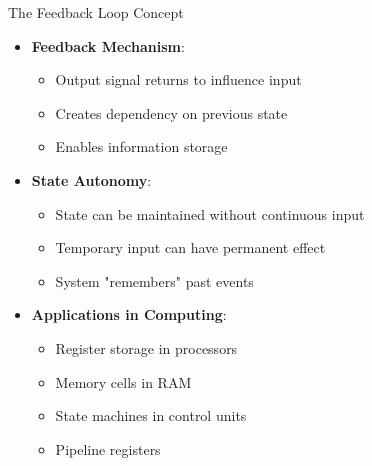 \documentclass[aspectratio=169,11pt]{beamer}
\newcommand{\concept}[1]{\textbf{\color{accentcolor}#1}}
\begin{document}
\begin{frame}{The Feedback Loop Concept}
\begin{itemize}
\item \concept{Feedback Mechanism}:
\begin{itemize}
\item Output signal returns to influence input
\item Creates dependency on previous state
\item Enables information storage
\end{itemize}
\vspace{0.5cm}
\item \concept{State Autonomy}:
\begin{itemize}
\item State can be maintained without continuous input
\item Temporary input can have permanent effect
\item System "remembers" past events
\end{itemize}
\vspace{0.5cm}
\item \concept{Applications in Computing}:
\begin{itemize}
\item Register storage in processors
\item Memory cells in RAM
\item State machines in control units
\item Pipeline registers
\end{itemize}
\end{itemize}
\end{frame}

\end{document}
